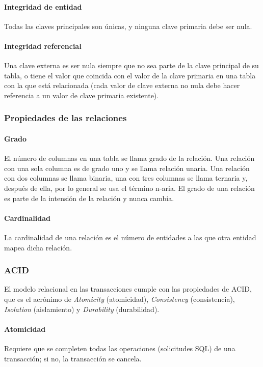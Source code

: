 \paragraph*{Integridad de entidad}
Todas las claves principales son únicas, y ninguna clave primaria debe ser nula.
\paragraph*{Integridad referencial}
Una clave externa es ser nula siempre que no sea parte de la clave principal de su tabla, o tiene el valor que coincida con el valor de la clave primaria en una tabla con la que está relacionada (cada valor de clave externa no nula debe hacer referencia a un valor de clave primaria existente).

\subsubsection{Propiedades de las relaciones}
\paragraph*{Grado}
El número de columnas en una tabla se llama grado de la relación. Una relación con una sola columna es de grado uno y se llama relación unaria. Una relación con dos columnas se llama binaria, una con tres columnas se llama ternaria y, después de ella, por lo general se usa el término n-aria. El grado de una relación es parte de la intensión de la relación y nunca cambia.


\paragraph*{Cardinalidad}
La cardinalidad de una relación es el número de entidades a las que otra entidad mapea dicha relación.

\subsubsection{ACID}
El modelo relacional en las transacciones cumple con las propiedades de ACID, que es el acrónimo de \textit{Atomicity} (atomicidad), \textit{Consistency} (consistencia), \textit{Isolation} (aislamiento) y \textit{Durability} (durabilidad). 

\paragraph*{Atomicidad}
Requiere que se completen todas las operaciones (solicitudes SQL) de una transacción;
si no, la transacción se cancela. 


